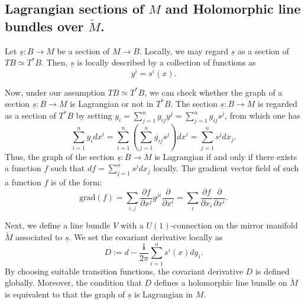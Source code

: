 \documentclass[12pt,reqno]{amsart}
\newcommand{\ii}{{\mathbf{i}}}
\newcommand{\del}{{\partial}}
\newcommand{\grad}{{\mathrm{grad}}}
\theoremstyle{definition}
\begin{document}
\subsection{Lagrangian sections of $M$ and Holomorphic line bundles over $\check{M}$.}\label{lag-line}
Let $\underline{s}:B\to M$ be a section of $M \to B$. Locally, we may regard $\underline{s}$ as a section of $TB \simeq T^*B$. Then, $\underline{s}$ is locally described by a collection of functions as 
\begin{equation*}
y^i = s^i(x).
\end{equation*}
\par
Now, under our assumption $TB\simeq T^*B$, we can check whether the graph of a section $\underline{s}:B\to M$ is Lagrangian or not in $T^*B$. The section $\underline{s}:B\to M$ is regarded as a section of $T^*B$ by setting $y_i=\sum_{j=1}^ng_{ij}y^j=\sum_{j=1}^ng_{ij}s^j$, from which one has
\begin{equation*}
\sum_{i=1}^n y_idx^i = \sum_{i=1}^n\left(\sum_{j=1}^ng_{ij}s^j\right)dx^i = \sum_{j=1}^ns^jdx_j.
\end{equation*}
Thus, the graph of the section $\underline{s}:B\to M$ is Lagrangian if and only if there exists a function $f$ such that $df=\sum_{j=1}^ns^jdx_j$ locally. The gradient vector field of such a function $f$ is of the form:
\begin{equation}\label{gra}
\grad(f) = \sum_{i,j}\frac{\del f}{\del x^j}g^{ji}\frac{\del}{\del x^i} = \sum_i\frac{\del f}{\del x_i}\frac{\del}{\del x^i}.
\end{equation}

Next, we define a line bundle $V$ with a $U(1)$-connection on the mirror manifold $\check{M}$ associated to $\underline{s}$. We set the covariant derivative locally as
\begin{equation*}
D := d - \frac{\ii}{2\pi}\sum_{i=1}^ns^i(x)dy_i.
\end{equation*}
By choosing suitable transition functions, the covariant derivative $D$ is defined globally. Moreover, the condition that $D$ defines a holomorphic line bundle on $\check{M}$ is equivalent to that the graph of $\underline{s}$ is Lagrangian in $M$. 
\end{document}
